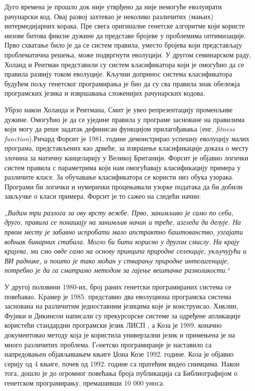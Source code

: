 \documentclass[a4paper]{article}
\begin{document}
Дуго времена је прошло док није утврђено  да није немогуће еволуирати рачунарски код. Овај развој захтевао је неколико различитих (мањих) интермедијарних корака. Пре свега оригиналне генетске алгоритме који користе низове битова фиксне дужине да представе бројеве у проблемима оптимизације. Прво схватање било је да се систем правила, уместо бројева који представљају проблематична решења, може подвргнути еволуцији. У другом семинарском раду, Холанд и Реитман представили су систем класификатора који је омогућио да се правила развију током еволуције. Кључни допринос система класификатора будућем пољу генетског програмирања је био да су сва правила знак обележја програмских језика и извршавања сложенијих рачунарских кодова.


Убрзо након Холанда и Реитмана, Смит је увео репрезентацију променљиве дужине.  Омогућио је да се уједине правила у програме засноване на правилима који могу да реше задатак дефинисан функцијом прилагођавања (енг.\textit{ fitness function}).Ричард Форсит је 1981. године демонстрирао успешну еволуцију малих програма, представљених као дрвеће, за извршење класификације доказа о месту злочина за матичну канцеларију у Великој Британији. Форсит је објавио логички систем правила с параметрима који нам омогућавају класификацију примера у различите класе. За обучавање класификатора се користи низ обука узорака. Програми би логички и нумерички процењивали узорке података да би добили закључке о класи примера. Форсит је то сажео на следећи начин:

\textit{„Видим три разлога за ову врсту вежбе. Прво, занимљиво је само по себи,  друго, правила се понашају на занимљив начин и треће, изгледа да делује. На првом месту је забавно испробати мало апстрактно баштованство, узгајати воћњак бинарних стабала. Могло би бити корисно у другом смислу. На крају крајева, ми смо овде само на основу принципа природне селекције, укључујући и ВИ раднике, и пошто је тако моћан у стварању природне интелигенције, потребно је да га сматрамо методом за гајење вештачке разноликости.“}


У другој половини 1980-их, број раних генетски програмираних система се повећавао. Kрамер је 1985. представио два еволуциона програмска система заснована на различитим једноставним језицима које је конструисао. Хиклин, Фујики и Дикинсон написали су прекурсорске системе за одређене апликације користећи стандардни програмски језик ЛИСП , а Коза је 1989. коначно документовао методу која је користила универзални језик и примењена је на много различитих проблема. Гeнетско програмиранје је наставило са напредовањен објављивањем књиге Џона Козе 1992. године. Коза је објавио серију од 4 књиге, почев од 1992. године са пратећим видео снимцима. Након тога, дошло је до огромног повећања броја публикација са Библиографијом о генетском програмирању, премашивши 10 000 уноса.
\end{document}
